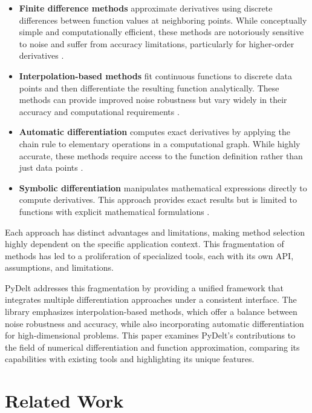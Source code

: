 \documentclass[11pt,a4paper]{article}
\begin{document}
\begin{itemize}
    \item \textbf{Finite difference methods} approximate derivatives using discrete differences between function values at neighboring points. While conceptually simple and computationally efficient, these methods are notoriously sensitive to noise and suffer from accuracy limitations, particularly for higher-order derivatives \citep{fornberg1988generation}.
    
    \item \textbf{Interpolation-based methods} fit continuous functions to discrete data points and then differentiate the resulting function analytically. These methods can provide improved noise robustness but vary widely in their accuracy and computational requirements \citep{de2001numerical}.
    
    \item \textbf{Automatic differentiation} computes exact derivatives by applying the chain rule to elementary operations in a computational graph. While highly accurate, these methods require access to the function definition rather than just data points \citep{baydin2018automatic}.
    
    \item \textbf{Symbolic differentiation} manipulates mathematical expressions directly to compute derivatives. This approach provides exact results but is limited to functions with explicit mathematical formulations \citep{sympy2017}.
\end{itemize}

Each approach has distinct advantages and limitations, making method selection highly dependent on the specific application context. This fragmentation of methods has led to a proliferation of specialized tools, each with its own API, assumptions, and limitations.

PyDelt addresses this fragmentation by providing a unified framework that integrates multiple differentiation approaches under a consistent interface. The library emphasizes interpolation-based methods, which offer a balance between noise robustness and accuracy, while also incorporating automatic differentiation for high-dimensional problems. This paper examines PyDelt's contributions to the field of numerical differentiation and function approximation, comparing its capabilities with existing tools and highlighting its unique features.

\section{Related Work}
\end{document}
